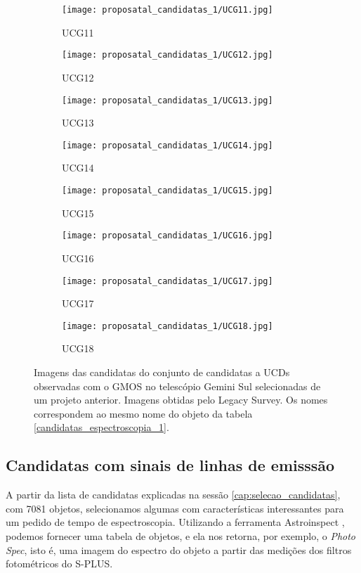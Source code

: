 \begin{figure}[!ht]
\begin{subfigure}[b]{0.22\textwidth}
        \texttt{[image: proposatal\_candidatas\_1/UCG11.jpg]}
        \caption{UCG11}
    \end{subfigure}
    \begin{subfigure}[b]{0.22\textwidth}
        \texttt{[image: proposatal\_candidatas\_1/UCG12.jpg]}
        \caption{UCG12}
    \end{subfigure}
    \begin{subfigure}[b]{0.22\textwidth}
        \texttt{[image: proposatal\_candidatas\_1/UCG13.jpg]}
        \caption{UCG13}
    \end{subfigure}
    \begin{subfigure}[b]{0.22\textwidth}
        \texttt{[image: proposatal\_candidatas\_1/UCG14.jpg]}
        \caption{UCG14}
    \end{subfigure}
    \begin{subfigure}[b]{0.22\textwidth}
        \texttt{[image: proposatal\_candidatas\_1/UCG15.jpg]}
        \caption{UCG15}
    \end{subfigure}
    \begin{subfigure}[b]{0.22\textwidth}
        \texttt{[image: proposatal\_candidatas\_1/UCG16.jpg]}
        \caption{UCG16}
    \end{subfigure}
    \begin{subfigure}[b]{0.22\textwidth}
        \texttt{[image: proposatal\_candidatas\_1/UCG17.jpg]}
        \caption{UCG17}
    \end{subfigure}
    \begin{subfigure}[b]{0.22\textwidth}
        \texttt{[image: proposatal\_candidatas\_1/UCG18.jpg]}
        \caption{UCG18}
    \end{subfigure}
    \caption{Imagens das candidatas do conjunto de candidatas a UCDs observadas com o GMOS no telescópio Gemini Sul selecionadas de um projeto anterior. Imagens obtidas pelo Legacy Survey. Os nomes correspondem ao mesmo nome do objeto da tabela \ref{candidatas_espectroscopia_1}.}
    \label{candidatas_espectroscopia_1_img}
\end{figure}


\vspace{\baselineskip}


\subsection*{Candidatas com sinais de linhas de emisssão}
A partir da lista de candidatas explicadas na sessão \ref{cap:selecao_candidatas}, com 7081 objetos, selecionamos algumas com características interessantes para um pedido de tempo de espectroscopia. Utilizando a ferramenta Astroinspect \cite{astroinspect}, podemos fornecer uma tabela de objetos, e ela nos retorna, por exemplo, o \textit{Photo Spec}, isto é, uma imagem do espectro do objeto a partir das medições dos filtros fotométricos do S-PLUS.

